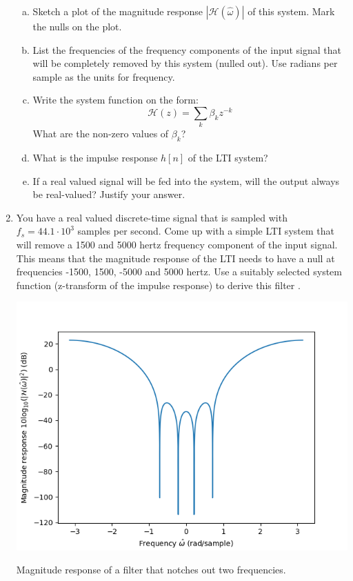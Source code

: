 \begin{enumerate}
\begin{enumerate}[a)]
  \item Sketch a plot of the magnitude response $|\mathcal{H}(\hat{\omega})|$ of this system. Mark the nulls on the plot.
  \item List the frequencies of the frequency components of the input signal that will be completely removed by this system (nulled out). Use radians per sample as the units for frequency.
  \item Write the system function on the form:
    \begin{equation}
      \mathcal{H}(z) = \sum_k \beta_k z^{-k}
    \end{equation}
    What are the non-zero values of $\beta_k$?
  \item What is the impulse response $h[n]$ of the LTI system?
  \item If a real valued signal will be fed into the system, will the output always be real-valued? Justify your answer.
  \end{enumerate}
  
\item You have a real valued discrete-time signal that is sampled with $f_s=44.1 \cdot 10^{3}$ samples per second. 
Come up with a simple LTI system that will remove a 1500 and 5000 hertz frequency component of the input signal. 
This means that the magnitude response of the LTI needs to have a null at frequencies -1500, 1500, -5000 and 5000 hertz. 
Use a suitably selected system function (z-transform of the impulse response) to derive this filter
.

\begin{marginfigure}
\begin{center}
\includegraphics[width=\textwidth]{ch18/figures/ex_magresp.png}
\end{center}
\caption{Magnitude response of a filter that notches out two frequencies.}
\label{fig:2notch}
\end{marginfigure}


\end{enumerate}

